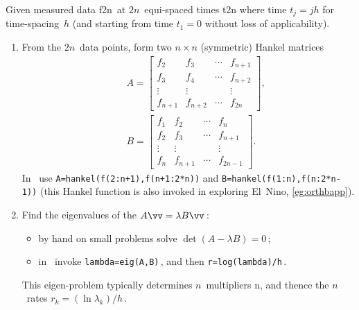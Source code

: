 \begin{procedure} \label{pro:ei}
Given measured data \hlist f{2n}\ at \(2n\)~equi-spaced times \hlist t{2n} where time \(t_j=jh\) for time-spacing~\(h\) (and starting from time \(t_1=0\) without loss of applicability).
\begin{enumerate}
\item From the \(2n\)~data points, form two \(n\times n\) (symmetric) Hankel matrices 
\begin{eqnarray*}&&
A=\begin{bmatrix} f_2&f_3&\cdots&f_{n+1}
\\f_3&f_4&\cdots&f_{n+2}
\\\vdots&\vdots&&\vdots
\\f_{n+1}&f_{n+2}&\cdots&f_{2n} \end{bmatrix},
\\&&
B=\begin{bmatrix} f_1&f_2&\cdots&f_{n}
\\f_2&f_3&\cdots&f_{n+1}
\\\vdots&\vdots&&\vdots
\\f_{n}&f_{n+1}&\cdots&f_{2n-1} \end{bmatrix}.
\end{eqnarray*}
In \script\ use \verb|A=hankel(f(2:n+1),f(n+1:2*n))| and \verb|B=hankel(f(1:n),f(n:2*n-1))| (this Hankel function is also invoked in exploring El~Nino, \autoref{eg:orthbapp}).

\item Find the eigenvalues of the  \(A\vv=\lambda B\vv\)\,: 
\begin{itemize}
\item by hand on small problems solve \(\det(A-\lambda B)=0\)\,;
\item in \script\ invoke \verb|lambda=eig(A,B)|\,, and then \verb|r=log(lambda)/h|\,.
\end{itemize}
This eigen-problem typically determines \(n\)~multipliers \hlist\lambda n, and thence the \(n\)~rates \(r_k=(\ln\lambda_k)/h\)\,.


\end{enumerate}
\end{procedure}
